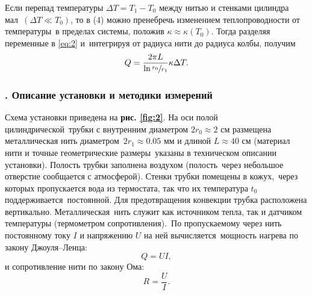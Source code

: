 \documentclass[a4paper, 12pt]{article}
\begin{document}
Если перепад температуры $\Delta T = T_1 - T_0$ между нитью и стенками цилиндра мал\
$(\Delta T \ll T_0)$, то в (4) можно пренебречь изменением теплопроводности от температуры\
в пределах системы, положив $\kappa \approx \kappa(T_0)$. Тогда разделяя переменные в \eqref{eq:2} и\
интегрируя от радиуса нити до радиуса колбы, получим
\begin{equation}
Q = \frac{2 \pi L}{\ln{\sfrac{r_0}{r_1}}}\kappa \Delta T.
\end{equation}

\subsubsection*{\Rnum{2}. Описание установки и методики измерений}

Схема установки приведена на \textbf{рис. \ref{fig:2}}. На оси полой цилиндрической\
трубки с внутренним диаметром $2r_0 \approx 2$ см размещена металлическая нить диаметром\
$2r_1 \approx 0.05$ мм и длиной $L \approx 40$ см (материал нити и точные геометрические размеры\
указаны в техническом описании установки). Полость трубки заполнена воздухом (полость\
через небольшое отверстие сообщается с атмосферой). Стенки трубки помещены в кожух,\
через которых пропускается вода из термостата, так что их температура $t_0$ поддерживается\
постоянной. Для предотвращения конвекции трубка расположена вертикально. Металлическая\
нить служит как источником тепла, так и датчиком температуры (термометром сопротивления).\
По пропускаемому через нить постоянному току $I$ и напряжению $U$ на ней вычисляется\
мощность нагрева по закону Джоуля–Ленца:
\begin{equation}
  Q = UI,
\end{equation}
и сопротивление нити по закону Ома:
\begin{equation}
  R = \frac{U}{I}.
\end{equation}
\end{document}
